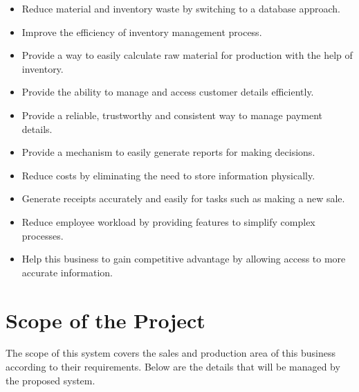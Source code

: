 \documentclass[12pt]{report}
\begin{document}
\begin{itemize}
	\item Reduce material and inventory waste by switching to a database approach.

	\item Improve the efficiency of inventory management process.

	\item Provide a way to easily calculate raw material for production with the help of inventory.

	\item Provide the ability to manage and access customer details efficiently.

	\item Provide a reliable,  trustworthy and consistent way to manage payment details.

	\item Provide a mechanism to easily generate reports for making decisions.

	\item Reduce costs by eliminating the need to store information physically.

	\item Generate receipts accurately and easily for tasks such as making a new sale.

	\item Reduce employee workload by providing features to simplify complex processes.

	\item Help this business to gain competitive advantage by allowing access to more accurate information.
\end{itemize}

\section{Scope of the Project}
The scope of this system covers the sales and production area of this business according to their requirements. Below are the details that will be managed by the proposed system.
\end{document}

